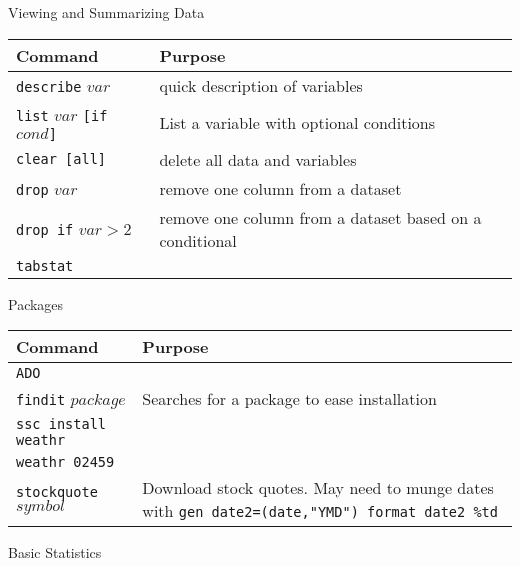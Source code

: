 \documentclass[11pt, oneside]{article}   	%
\begin{document}
\begin{center}
\large{Viewing and Summarizing Data}
\end{center}

\begin{tabular}{l p{} }
Command & Purpose \\
\hline
\texttt{describe} $var$  & quick description of variables \\

\texttt{list} $var$ \texttt{[if} $cond$\texttt{]} & List a variable with optional conditions\\

\texttt{clear [all]} & delete all data and variables \\

\texttt{drop} $var$ & remove one column from a dataset \\

\texttt{drop if} $var > 2$ & remove one column from a dataset based on a conditional\\

\texttt{tabstat} &  \\

\end{tabular}


\begin{center}
\large{Packages}
\end{center}

\begin{tabular}{l p{ } }
Command & Purpose \\
\hline
\texttt{ADO}& \\ 

\texttt{findit} $package$ & Searches for a package to ease installation\\ 

\texttt{ssc install weathr} &  \\


\texttt{weathr 02459} &  \\

\texttt{stockquote} $symbol$ & Download stock quotes. May need to munge dates with \texttt{gen date2=(date,"YMD")  format date2 \%td} \\



\end{tabular}

\begin{center}
\large{Basic Statistics}
\end{center}
\end{document}
